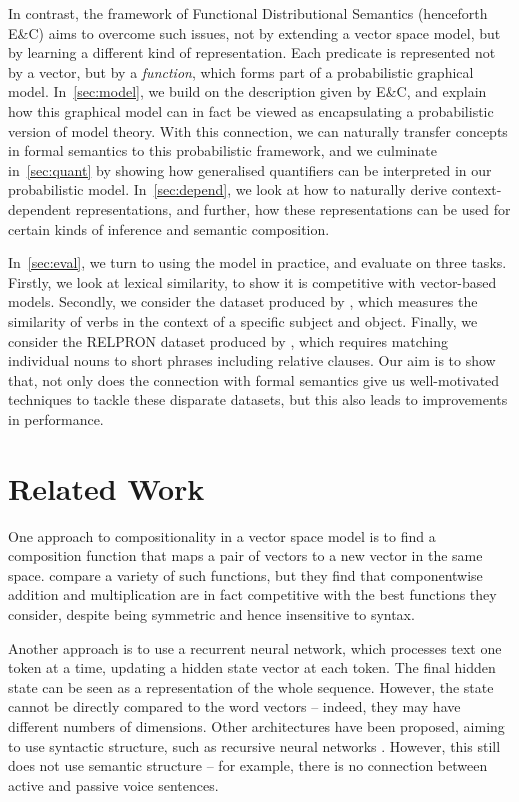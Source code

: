 \documentclass[a4paper,11pt]{article}
\begin{document}
In contrast, the framework of Functional Distributional Semantics \citep{emerson2016} (henceforth E\&C)
aims to overcome such issues, not by extending a vector space model,
but by learning a different kind of representation.
Each predicate is represented not by a vector, but by a \textit{function},
which forms part of a probabilistic graphical model.
In~\cref{sec:model}, we build on the description given by E\&C,
and explain how this graphical model
can in fact be viewed as encapsulating a probabilistic version of model theory.
With this connection, we can naturally transfer concepts in formal semantics
to this probabilistic framework,
and we culminate in~\cref{sec:quant}
by showing how generalised quantifiers
can be interpreted in our probabilistic model.
In~\cref{sec:depend}, we look at
how to naturally derive context-dependent representations,
and further, how these representations can be used
for certain kinds of inference and semantic composition.

In~\cref{sec:eval}, we turn to using the model in practice, and evaluate on three tasks.
Firstly, we look at lexical similarity,
to show it is competitive with vector-based models.
Secondly, we consider the dataset produced by \citet{grefenstette2011svo},
which measures the similarity of verbs in the context of a specific subject and object.
Finally, we consider the RELPRON dataset produced by \citet{rimell2016relpron},
which requires matching individual nouns to short phrases including relative clauses.
Our aim is to show that,
not only does the connection with formal semantics give us
well-motivated techniques to tackle these disparate datasets,
but this also leads to improvements in performance.

\pagebreak


\section{Related Work}
\label{sec:rel}

One approach to compositionality in a vector space model
is to find a composition function that maps a pair of vectors
to a new vector in the same space.
\citet{mitchell2010compose} compare a variety of such functions,
but they find that componentwise addition and multiplication are in fact
competitive with the best functions they consider,
despite being symmetric and hence insensitive to syntax.

Another approach is to use a recurrent neural network,
which processes text one token at a time,
updating a hidden state vector at each token.
The final hidden state can be seen as a representation of the whole sequence.
However, the state cannot be directly compared to the word vectors --
indeed, they may have different numbers of dimensions.
Other architectures have been proposed, aiming to use syntactic structure,
such as recursive neural networks \citep{socher2010recursive}.
However, this still does not use semantic structure --
for example, there is no connection between active and passive voice sentences.
\end{document}
